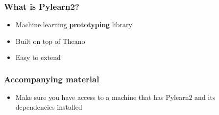 \documentclass[mathserif, xcolor=dvipsnames]{beamer}
\begin{document}
\begin{frame}
    \frametitle{What is Pylearn2?}
    \begin{itemize}\addtolength{\itemsep}{2.0\baselineskip}
        \item{\LARGE Machine learning \textbf{prototyping} library}
        \item{\LARGE Built on top of Theano}
        \item{\LARGE Easy to extend}
    \end{itemize}
\end{frame}

\begin{frame}
    \frametitle{Accompanying material}
    \begin{itemize}\addtolength{\itemsep}{2.0\baselineskip}
        \item{\Large Make sure you have access to a machine that has Pylearn2
              and its dependencies installed}
    \end{itemize}
\end{frame}
\end{document}
